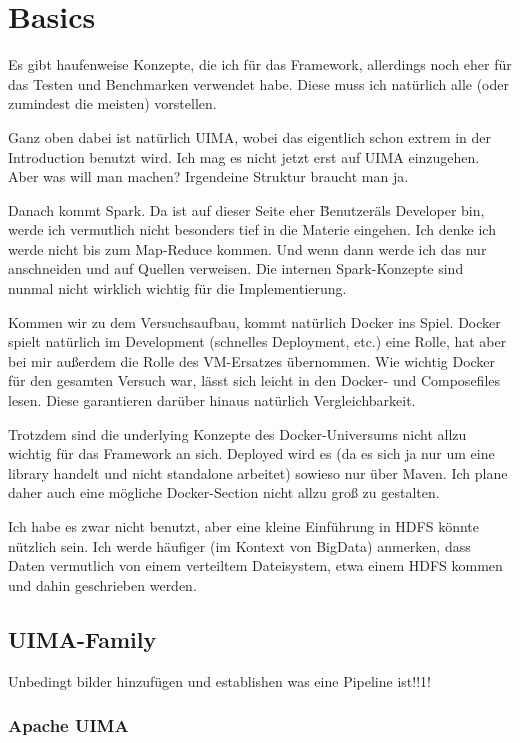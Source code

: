 
\chapter{Basics}


Es gibt haufenweise Konzepte, die ich für das Framework, allerdings noch eher für das Testen und Benchmarken verwendet habe. Diese muss ich natürlich alle (oder zumindest die meisten) vorstellen.

Ganz oben dabei ist natürlich UIMA, wobei das eigentlich schon extrem in der Introduction benutzt wird. Ich mag es nicht jetzt erst auf UIMA einzugehen. Aber was will man machen? Irgendeine Struktur braucht man ja.

Danach kommt Spark. Da ist auf dieser Seite eher \"Benutzer\" als Developer bin, werde ich vermutlich nicht besonders tief in die Materie eingehen. Ich denke ich werde nicht bis zum Map-Reduce kommen. Und wenn dann werde ich das nur anschneiden und auf Quellen verweisen. Die internen Spark-Konzepte sind nunmal nicht wirklich wichtig für die Implementierung.

Kommen wir zu dem Versuchsaufbau, kommt natürlich Docker ins Spiel. Docker spielt natürlich im Development (schnelles Deployment, etc.) eine Rolle, hat aber bei mir außerdem die Rolle des VM-Ersatzes übernommen. Wie wichtig Docker für den gesamten Versuch war, lässt sich leicht in den Docker- und Composefiles lesen. Diese garantieren darüber hinaus natürlich Vergleichbarkeit.

Trotzdem sind die underlying Konzepte des Docker-Universums nicht allzu wichtig für das Framework an sich. Deployed wird es (da es sich ja nur um eine library handelt und nicht standalone arbeitet) sowieso nur über Maven. Ich plane daher auch eine mögliche Docker-Section nicht allzu groß zu gestalten.

Ich habe es zwar nicht benutzt, aber eine kleine Einführung in HDFS könnte nützlich sein. Ich werde häufiger (im Kontext von BigData) anmerken, dass Daten vermutlich von einem verteiltem Dateisystem, etwa einem HDFS kommen und dahin geschrieben werden.

\section{UIMA-Family}

Unbedingt bilder hinzufügen und establishen was eine Pipeline ist!!1!

\subsection{Apache UIMA}


